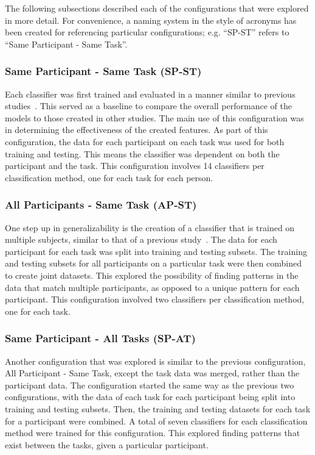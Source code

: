 \documentclass[11pt]{article}
\begin{document}
	The following subsections described each of the configurations that were explored in more detail. For convenience, a naming system in the style of acronyms has been created for referencing particular configurations; e.g. ``SP-ST'' refers to ``Same Participant - Same Task''.
		
		\subsubsection{Same Participant - Same Task (SP-ST)}
		Each classifier was first trained and evaluated in a manner similar to previous studies~\cite{Wilson, Zhang, Wang_R, Yin}. This served as a baseline to compare the overall performance of the models to those created in other studies. The main use of this configuration was in determining the effectiveness of the created features. As part of this configuration, the data for each participant on each task was used for both training and testing. This means the classifier was dependent on both the participant and the task. This configuration involves 14 classifiers per classification method, one for each task for each person.
		 
		\subsubsection{All Participants - Same Task (AP-ST)}
		One step up in generalizability is the creation of a classifier that is trained on multiple subjects, similar to that of a previous study~\cite{Wang_Z}. The data for each participant for each task was split into training and testing subsets. The training and testing subsets for all participants on a particular task were then combined to create joint datasets. This explored the possibility of finding patterns in the data that match multiple participants, as opposed to a unique pattern for each participant. This configuration involved two classifiers per classification method, one for each task.
		
		\subsubsection{Same Participant - All Tasks (SP-AT)}
		Another configuration that was explored is similar to the previous configuration, All Participant - Same Task, except the task data was merged, rather than the participant data. The configuration started the same way as the previous two configurations, with the data of each task for each participant being split into training and testing subsets. Then, the training and testing datasets for each task for a participant were combined. A total of seven classifiers for each classification method were trained for this configuration. This explored finding patterns that exist between the tasks, given a particular participant.
		
\end{document}
